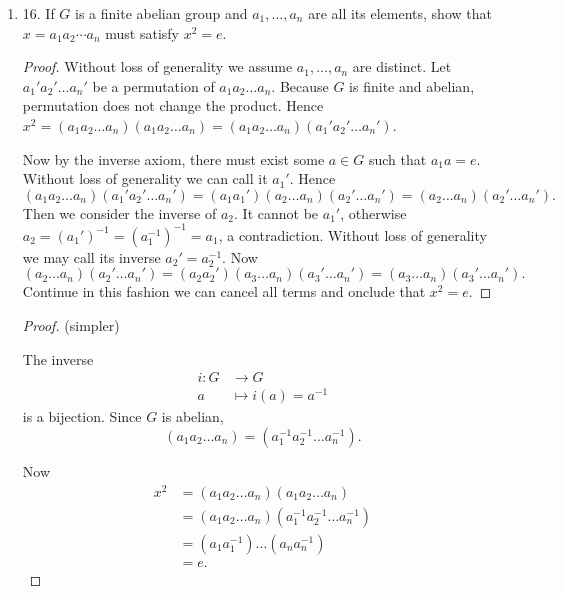 \begin{enumerate}
	\item 16. If $G$ is a finite abelian group and $a_1, \ldots, a_n$ are all its elements, show that $x=a_1 a_2 \cdots a_n$ must satisfy $x^2=e$.
\begin{proof}
	Without loss of generality we assume $a_1, \ldots, a_n$ are distinct.
	Let $a_1'a_2'\ldots a_n'$ be a permutation of $a_1a_2\ldots a_n$. Because $G$ is finite and abelian, permutation does not change the product. Hence $x^2 = (a_1a_2\ldots a_n)(a_1a_2 \ldots a_n) = (a_1a_2\ldots a_n)(a_1'a_2' \ldots a_n')$.

	Now by the inverse axiom, there must exist some $a \in G$ such that $a_1 a = e$. Without loss of generality we can call it $a_1'$. Hence
\[
	(a_1a_2 \ldots a_n) (a_1'a_2' \ldots a_n') = 
	(a_1a_1')(a_2\ldots a_n) (a_2' \ldots a_n') = 
	(a_2 \ldots a_n) (a_2' \ldots a_n')
.\] 
Then we consider the inverse of $a_2$. It cannot be $a_1'$, otherwise $a_2 = \left( a_1' \right) ^{-1} = \left( a_1^{-1} \right) ^{-1} = a_1$, a contradiction. Without loss of generality we may call its inverse $a_2' = a_2^{-1}$. Now
\[
	(a_2 \ldots a_n) (a_2' \ldots a_n') = 
	(a_2 a_2') (a_3 \ldots a_n) (a_3' \ldots a_n')= 
	(a_3 \ldots a_n) (a_3' \ldots a_n')
.\] 
Continue in this fashion we can cancel all terms and onclude that $x^2 = e$.
\end{proof}
\begin{proof}
	(simpler)

	The inverse  \begin{align*}
		i: G &\longrightarrow G \\
		a &\longmapsto i(a) = a^{-1}
	\end{align*} is a bijection. 
	Since $G$ is abelian,
	\[
		(a_1a_2\ldots a_n) =
		(a_1^{-1} a_2^{-1} \ldots a_n^{-1})
	.\] 

	Now
	\begin{align*}
		x^2 &= (a_1a_2\ldots a_n)(a_1a_2\ldots a_n)\\
		&= (a_1a_2\ldots a_n) (a_1^{-1} a_2^{-1} \ldots a_n^{-1})\\
		&= (a_1a_1^{-1})\ldots(a_n a_n^{-1}) \\
		&= e
	.\end{align*} 

\end{proof}


\end{enumerate}
